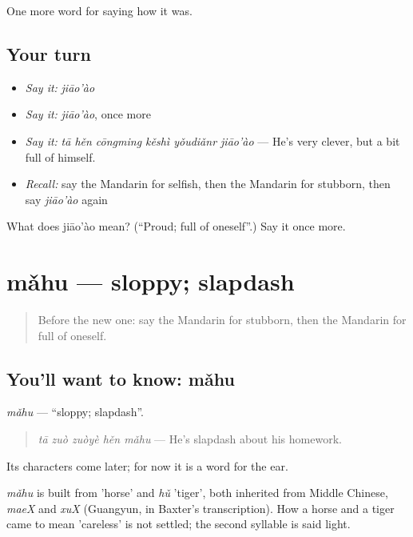 \begin{grammarlens}[title={What you've built}]
One more word for saying how it was.
\end{grammarlens}

\subsection*{Your turn}
\begin{itemize}
\raggedright
  \item \emph{Say it:} \emph{jiāo'ào}
  \item \emph{Say it:} \emph{jiāo'ào}, once more
  \item \emph{Say it:} \emph{tā hěn cōngming kěshì yǒudiǎnr jiāo'ào} — He's very clever, but a bit full of himself.
  \item \emph{Recall:} say the Mandarin for selfish, then the Mandarin for stubborn, then say \emph{jiāo'ào} again
\end{itemize}

\begin{tcolorbox}[breakable,colback=teal!4,colframe=teal!35!black,title={Before you move on}]
What does jiāo'ào mean? (\textquotedblleft{}Proud; full of oneself\textquotedblright{}.) Say it once more.
\end{tcolorbox}
\section[mǎhu]{mǎhu — sloppy; slapdash}

\label{lesson:ZH-C470-mahu}



\begin{quote}
Before the new one: say the Mandarin for stubborn, then the Mandarin for full of oneself.
\end{quote}

\subsection*{You'll want to know: mǎhu}
\emph{mǎhu} — \textquotedblleft{}sloppy; slapdash\textquotedblright{}.

\begin{quote}
\emph{tā zuò zuòyè hěn mǎhu} — He's slapdash about his homework.
\end{quote}

Its characters come later; for now it is a word for the ear.

\begin{cousinweb}
\emph{mǎhu} is built from  'horse' and \emph{hǔ} 'tiger', both inherited from Middle Chinese, \emph{maeX} and \emph{xuX} (Guangyun, in Baxter's transcription). How a horse and a tiger came to mean 'careless' is not settled; the second syllable is said light.
\end{cousinweb}

